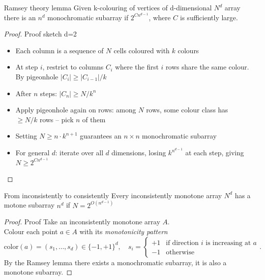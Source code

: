 \begin{frame}{}
    \begin{lemma}{Ramsey theory lemma}
    Given k-colouring of vertices of d-dimensional \(N^d\) array there is an \(n^d\) monochromatic subarray if \(2^{Cn^{d-1}}\), where \(C\) is sufficiently large.
    \end{lemma}
    \pause
    \begin{proof}{Proof sketch d=2}
        \begin{itemize}
            \item Each column is a sequence of $N$ cells coloured with $k$ colours
            \item At step $i$, restrict to columns $C_i$ where the first $i$ rows 
            share the same colour. By pigeonhole $|C_i| \geq |C_{i-1}|/k$
            \pause
            \item After $n$ steps: $|C_n| \geq N/k^n$
            \item Apply pigeonhole again on rows: among $N$ rows, 
            some colour class has $\geq N/k$ rows -- pick $n$ of them
            \item Setting $N \geq n \cdot k^{n+1}$ guarantees an $n \times n$ 
            monochromatic subarray
            \pause
            \item For general $d$: iterate over all $d$ dimensions, 
            losing $k^{n^{d-1}}$ at each step, giving $N \geq 2^{Cn^{d-1}}$
        \end{itemize}
    \end{proof}
\end{frame}




\begin{frame}{}
    \begin{theorem}{From inconsistently to consistently}
        Every inconsistently monotone array \(N^d\) has a motone subarray \(n^d\) if \(N=2^{O(n^{d-1})}\)
    \end{theorem}
    \pause
    \begin{proof}{Proof}
    Take an inconsistently monotone array \(A\).\\
    Colour each point \( a \in A \) with its
      \emph{monotonicity pattern}
      \[
        \mathrm{color}(a) = (s_1,\ldots,s_d) \in \{-1,+1\}^d,
        \quad s_i = \begin{cases} +1 & \text{if direction } i \text{ is increasing at } a \\ -1 & \text{otherwise} \end{cases}.
      \]
      By the Ramsey lemma there exists a monochromatic subarray, it is also a monotone subarray.
    \end{proof}
\end{frame}

